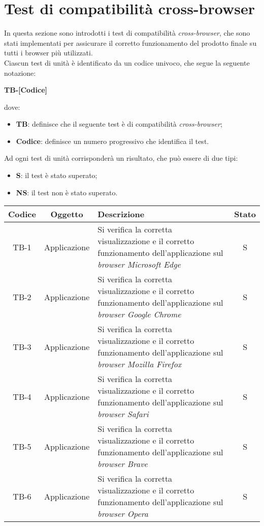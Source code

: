 \section{Test di compatibilità cross-browser}
In questa sezione sono introdotti i test di compatibilità \textit{cross-browser}, che sono stati implementati per assicurare il corretto funzionamento del prodotto finale su tutti i browser più utilizzati.\\
Ciascun test di unità è identificato da un codice univoco, che segue la seguente notazione:
\begin{center}
  \textbf{TB-[Codice]}
\end{center}
dove:
\begin{itemize}
  \item \textbf{TB}: definisce che il seguente test è di compatibilità \textit{cross-browser};
  \item \textbf{Codice}: definisce un numero progressivo che identifica il test.
\end{itemize}
Ad ogni test di unità corrisponderà un risultato, che può essere di due tipi:
\begin{itemize}
  \item \textbf{S}: il test è stato superato;
  \item \textbf{NS}: il test non è stato superato.
\end{itemize}

\begin{center}
  \label{tab:test-compatibilita-cross-browser}
  \begin{longtable}{|c|c|p{}|c|}
  \hline
  \textbf{Codice} & \textbf{Oggetto} & \textbf{Descrizione} & \textbf{Stato}\\
  \hline
  TB-1 &Applicazione &Si verifica la corretta visualizzazione e il corretto funzionamento dell'applicazione sul \textit{browser Microsoft Edge} &S \\
  \hline
  TB-2 &Applicazione  &Si verifica la corretta visualizzazione e il corretto funzionamento dell'applicazione  sul \textit{browser Google Chrome} &S \\
  \hline
  TB-3 &Applicazione &Si verifica la corretta visualizzazione e il corretto funzionamento dell'applicazione  sul \textit{browser Mozilla Firefox} &S \\
  \hline
  TB-4 &Applicazione &Si verifica la corretta visualizzazione e il corretto funzionamento dell'applicazione  sul \textit{browser Safari} &S \\
  \hline
  TB-5 &Applicazione &Si verifica la corretta visualizzazione e il corretto funzionamento dell'applicazione  sul \textit{browser Brave} &S \\
  \hline
  TB-6 &Applicazione &Si verifica la corretta visualizzazione e il corretto funzionamento dell'applicazione  sul \textit{browser Opera} &S \\
  \hline
\end{longtable}
\end{center}
